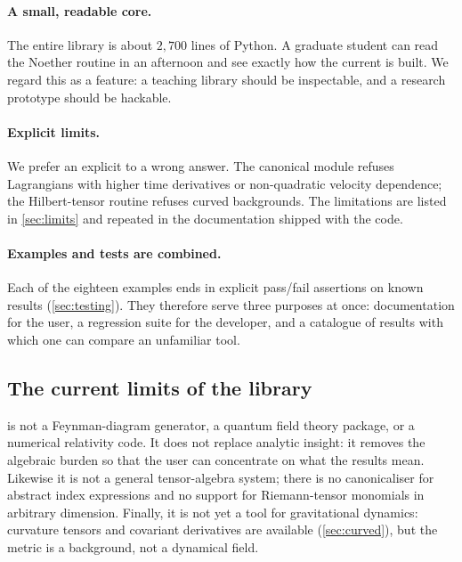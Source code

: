 \paragraph{A small, readable core.}
The entire library is about $2{,}700$ lines of Python. A graduate student can read the Noether routine in an afternoon and see exactly how the current is built. We regard this as a feature: a teaching library should be inspectable, and a research prototype should be hackable.

\paragraph{Explicit limits.}
We prefer an explicit  to a wrong answer. The canonical module refuses Lagrangians with higher time derivatives or non-quadratic velocity dependence; the Hilbert-tensor routine refuses curved backgrounds. The limitations are listed in \cref{sec:limits} and repeated in the documentation shipped with the code.

\paragraph{Examples and tests are combined.}
Each of the eighteen examples ends in explicit pass/fail assertions on known results (\cref{sec:testing}). They therefore serve three purposes at once: documentation for the user, a regression suite for the developer, and a catalogue of results with which one can compare an unfamiliar tool.

\subsection{The current limits of the library}

\fs{} is not a Feynman-diagram generator, a quantum field theory package, or a numerical relativity code. It does not replace analytic insight: it removes the algebraic burden so that the user can concentrate on what the results mean. Likewise it is not a general tensor-algebra system; there is no canonicaliser for abstract index expressions and no support for Riemann-tensor monomials in arbitrary dimension. Finally, it is not yet a tool for gravitational dynamics: curvature tensors and covariant derivatives are available (\cref{sec:curved}), but the metric is a background, not a dynamical field.

